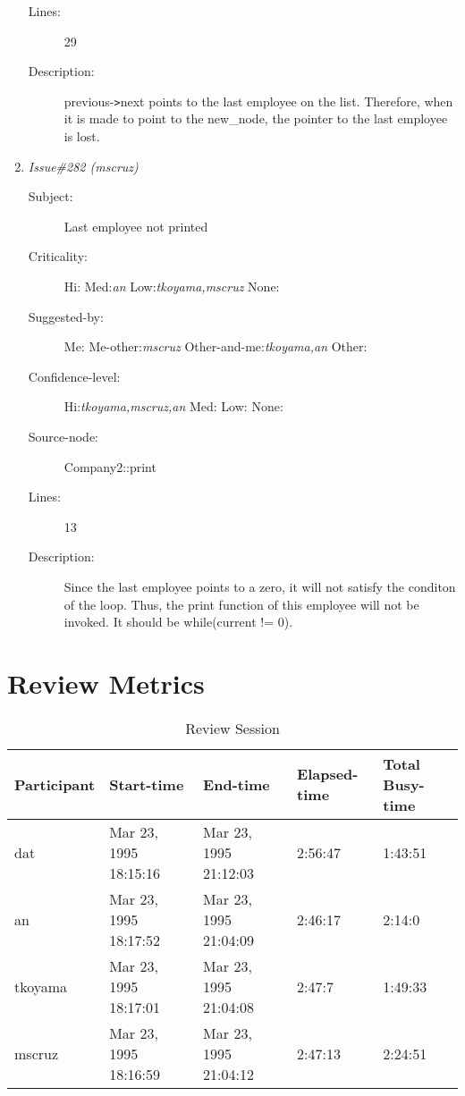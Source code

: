 \begin{enumerate}
\begin{description}
\item [Lines:] 29

\item [Description:] previous-{\tt >}next points to the last employee on
the list.  Therefore, when it is made to point to the new\_node, the pointer
to the last employee is lost.
\end{description}
\item {\it Issue\#282 (mscruz)}
\begin{description}
\item [Subject:] Last employee not printed
\item [Criticality:] Hi:{\it } Med:{\it an} Low:{\it tkoyama,mscruz} None:{\it }
\item [Suggested-by:] Me:{\it } Me-other:{\it mscruz} Other-and-me:{\it tkoyama,an} Other:{\it }
\item [Confidence-level:] Hi:{\it tkoyama,mscruz,an} Med:{\it } Low:{\it } None:{\it }
\item [Source-node:] Company2::print

\item [Lines:] 13

\item [Description:] Since the last employee points to a zero, it
will not satisfy the conditon of the loop.  Thus, the print function of this
employee will not be invoked.  It should be while(current != 0).
\end{description}
\end{enumerate}
\section{Review Metrics}
\begin{table}[hb]
\begin{center}
\begin{tabular}{|l|l|l|l|l|}
\hline
Participant & Start-time & End-time & Elapsed-time & Total Busy-time \\
\hline
dat & Mar 23, 1995 18:15:16 & Mar 23, 1995 21:12:03 & 2:56:47 & 1:43:51 \\
an & Mar 23, 1995 18:17:52 & Mar 23, 1995 21:04:09 & 2:46:17 & 2:14:0 \\
tkoyama & Mar 23, 1995 18:17:01 & Mar 23, 1995 21:04:08 & 2:47:7 & 1:49:33 \\
mscruz & Mar 23, 1995 18:16:59 & Mar 23, 1995 21:04:12 & 2:47:13 & 2:24:51 \\
\hline
\end{tabular}
\end{center}
\caption{Review Session}
\end{table}


